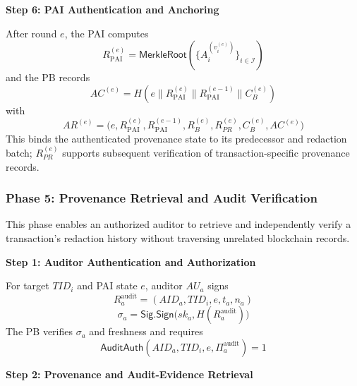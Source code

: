 \documentclass[lettersize,journal]{IEEEtran}
\begin{document}
\noindent\textbf{Step 6: PAI Authentication and Anchoring}

After round $e$, the PAI computes
\begin{equation}
R_{\mathrm{PAI}}^{(e)}
=
\mathsf{MerkleRoot}
\left(
\{A_i^{(v_i^{(e)})}\}_{i\in\mathcal I}
\right)
\label{eq:pai-root}
\end{equation}
and the PB records
\begin{equation}
AC^{(e)}
=
H\!\left(
e\parallel R_{\mathrm{PAI}}^{(e)}
\parallel R_{\mathrm{PAI}}^{(e-1)}
\parallel C_B^{(e)}
\right)
\label{eq:pai-anchor}
\end{equation}
with
\begin{equation}
AR^{(e)}
=
\big(
e,R_{\mathrm{PAI}}^{(e)},R_{\mathrm{PAI}}^{(e-1)},
R_B^{(e)},R_{PR}^{(e)},C_B^{(e)},AC^{(e)}
\big)
\label{eq:anchor-record}
\end{equation}
This binds the authenticated provenance state to its predecessor and
redaction batch; $R_{PR}^{(e)}$ supports subsequent verification of
transaction-specific provenance records.
\smallskip

\subsubsection*{\textbf{Phase 5: Provenance Retrieval and Audit Verification}}
\label{sec:phase5}

This phase enables an authorized auditor to retrieve and independently
verify a transaction's redaction history without traversing unrelated
blockchain records.

\noindent\textbf{Step 1: Auditor Authentication and Authorization}

For target $TID_i$ and PAI state $e$, auditor $AU_a$ signs
\begin{equation}
R_a^{\mathrm{audit}} = (AID_a, TID_i, e, t_a, n_a)
\end{equation}
\begin{equation}
\sigma_a = \mathsf{Sig.Sign}\big(sk_a, H(R_a^{\mathrm{audit}})\big)
\end{equation}
The PB verifies $\sigma_a$ and freshness and requires
\begin{equation}
\mathsf{AuditAuth}(AID_a, TID_i, e, \Pi_a^{\mathrm{audit}}) = 1
\label{eq:auditor-authorization}
\end{equation}

\noindent\textbf{Step 2: Provenance and Audit-Evidence Retrieval}
\end{document}
